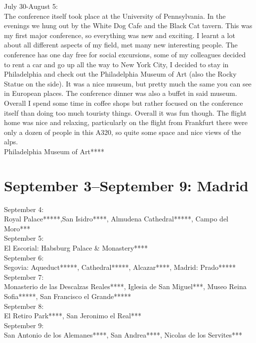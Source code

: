 July 30-August 5:\\
The conference itself took place at the University of Pennsylvania. In the evenings we hung out by the White Dog Cafe and the Black Cat tavern. This was my first major conference, so everything was new and exciting. I learnt a lot about all different aspects of my field, met many new interesting people. The conference has one day free for social excursions, some of my colleagues decided to rent a car and go up all the way to New York City, I decided to stay in Philadelphia and check out the Philadelphia Museum of Art (also the Rocky Statue on the side). It was a nice museum, but pretty much the same you can see in European places. The conference dinner was also a buffet in said museum. Overall I spend some time in coffee shops but rather focused on the conference itself than doing too much touristy things. Overall it was fun though. The flight home was nice and relaxing, particularly on the flight from Frankfurt there were only a dozen of people in this A320, so quite some space and nice views of the alps.\\

Philadelphia Museum of Art****

\section{September 3--September 9: Madrid}
\label{2008:Madrid}

September 4:\\
Royal Palace*****,San Isidro****, Almudena Cathedral*****, Campo del Moro***\\

September 5:\\
El Escorial: Habsburg Palace \& Monastery****\\

September 6:\\
Segovia: Aqueduct*****, Cathedral*****, Alcazar****, Madrid: Prado*****\\

September 7:\\
Monasterio de las Descalzas Reales****, Iglesia de San Miguel***, Museo Reina Sofia*****, San Francisco el Grande*****\\

September 8:\\
El Retiro Park****, San Jeronimo el Real***\\

September 9:\\
San Antonio de los Alemanes****, San Andrea****, Nicolas de los Servites***


